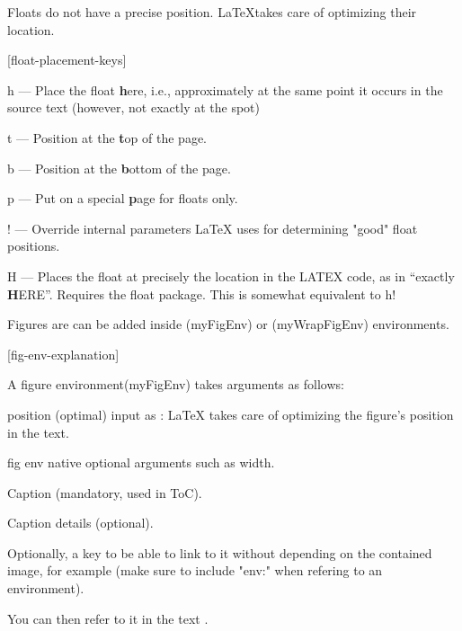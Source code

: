 Floats do not have a precise position. \LaTeX takes care of optimizing their location.

[float-placement-keys]

\begin{myListMeta}
  \item[h] ---	Place the float \textbf{h}ere, i.e., approximately at the same point it occurs in the source text (however, not exactly at the spot)
  \item[t] ---	Position at the \textbf{t}op of the page.
  \item[b] --- Position at the \textbf{b}ottom of the page.
  \item[p] --- Put on a special \textbf{p}age for floats only.
  \item[!] --- Override internal parameters LaTeX uses for determining "good" float positions.
  \item[H] ---	Places the float at precisely the location in the LATEX code, as in ``exactly \textbf{H}ERE''. Requires the float package. This is somewhat equivalent to h!
\end{myListMeta}




Figures are can be added inside  (myFigEnv) or  (myWrapFigEnv) environments.

[fig-env-explanation]

A figure environment(myFigEnv) takes arguments as follows:
\begin{myListItemize}
  \item position (optimal) input as : LaTeX takes care of optimizing the figure's position in the text.
  \item fig env native optional arguments such as width.
  \item Caption (mandatory, used in ToC).
  \item Caption details (optional).
  \item Optionally, a key to be able to link to it without depending on the contained image, for example  (make sure to include "env:" when refering to an environment).
\end{myListItemize}

You can then refer to it in the text .



